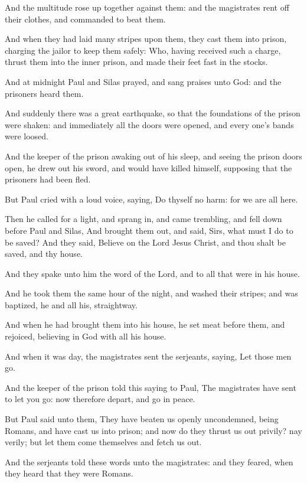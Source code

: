\verse And the multitude rose up together against them: and the magistrates rent off their clothes, and commanded to beat them.

\verse And when they had laid many stripes upon them, they cast them into prison, charging the jailor to keep them safely: \verse Who, having received such a charge, thrust them into the inner prison, and made their feet fast in the stocks.

\verse And at midnight Paul and Silas prayed, and sang praises unto God: and the prisoners heard them.

\verse And suddenly there was a great earthquake, so that the foundations of the prison were shaken: and immediately all the doors were opened, and every one's bands were loosed.

\verse And the keeper of the prison awaking out of his sleep, and seeing the prison doors open, he drew out his sword, and would have killed himself, supposing that the prisoners had been fled.

\verse But Paul cried with a loud voice, saying, Do thyself no harm: for we are all here.

\verse Then he called for a light, and sprang in, and came trembling, and fell down before Paul and Silas, \verse And brought them out, and said, Sirs, what must I do to be saved?  \verse And they said, Believe on the Lord Jesus Christ, and thou shalt be saved, and thy house.

\verse And they spake unto him the word of the Lord, and to all that were in his house.

\verse And he took them the same hour of the night, and washed their stripes; and was baptized, he and all his, straightway.

\verse And when he had brought them into his house, he set meat before them, and rejoiced, believing in God with all his house.

\verse And when it was day, the magistrates sent the serjeants, saying, Let those men go.

\verse And the keeper of the prison told this saying to Paul, The magistrates have sent to let you go: now therefore depart, and go in peace.

\verse But Paul said unto them, They have beaten us openly uncondemned, being Romans, and have cast us into prison; and now do they thrust us out privily? nay verily; but let them come themselves and fetch us out.

\verse And the serjeants told these words unto the magistrates: and they feared, when they heard that they were Romans.

